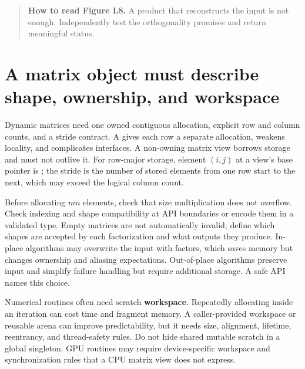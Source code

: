 
\begin{quote}
\textbf{How to read Figure L8.} A product that reconstructs the input is not enough. Independently test the orthogonality promises and return meaningful status.
\end{quote}

\section{A matrix object must describe shape, ownership, and workspace}\label{02-foundations-ii-ch038-a-matrix-object-must-describe-shape-ownership-and-workspace}

\hypertarget{02-foundations-ii-ch038-a-matrix-object-must-describe-shape-ownership-and-workspace}{}

Dynamic matrices need one owned contiguous allocation, explicit row and column counts, and a stride contract. A  gives each row a separate allocation, weakens locality, and complicates interfaces. A non-owning matrix view borrows storage and must not outlive it. For row-major storage, element \((i,j)\) at a view's base pointer is ; the stride is the number of stored elements from one row start to the next, which may exceed the logical column count.

Before allocating \(mn\) elements, check that size multiplication does not overflow. Check indexing and shape compatibility at API boundaries or encode them in a validated type. Empty matrices are not automatically invalid; define which shapes are accepted by each factorization and what outputs they produce. In-place algorithms may overwrite the input with factors, which saves memory but changes ownership and aliasing expectations. Out-of-place algorithms preserve input and simplify failure handling but require additional storage. A safe API names this choice.

Numerical routines often need scratch \textbf{workspace}. Repeatedly allocating inside an iteration can cost time and fragment memory. A caller-provided workspace or reusable arena can improve predictability, but it needs size, alignment, lifetime, reentrancy, and thread-safety rules. Do not hide shared mutable scratch in a global singleton. GPU routines may require device-specific workspace and synchronization rules that a CPU matrix view does not express.

